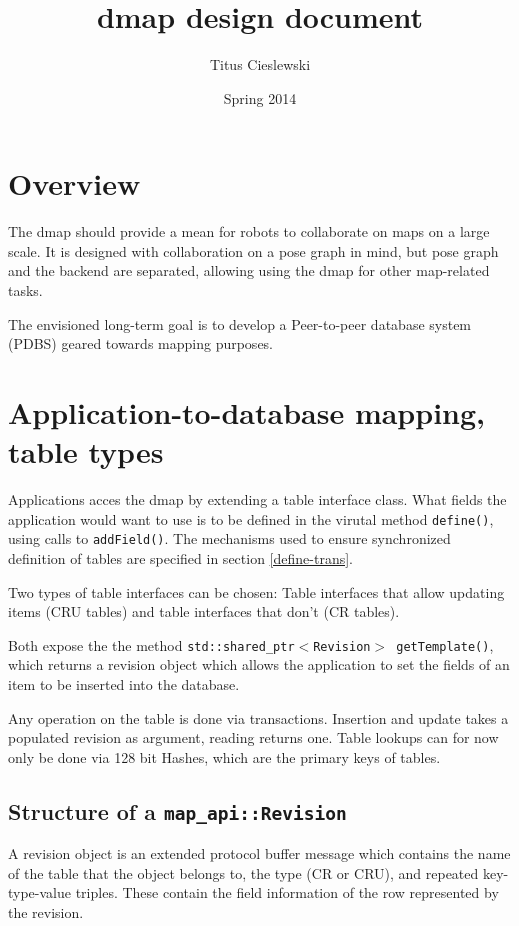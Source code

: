 \documentclass{article}
\title{dmap design document}
\author{Titus Cieslewski}
\date{Spring 2014}
\begin{document}
\maketitle

\section{Overview}

The dmap should provide a mean for robots to collaborate on maps on a large
scale. It is designed with collaboration on a pose graph in mind, but pose
graph and the backend are separated, allowing using the dmap for other
map-related tasks.

The envisioned long-term goal is to develop a Peer-to-peer database system
(PDBS) geared towards mapping purposes.

\section{Application-to-database mapping, table types}

Applications acces the dmap by extending a table interface class. What
fields the application would want to use is to be defined in the virutal
method {\tt define()}, using calls to {\tt addField()}. The mechanisms used to
ensure synchronized definition of tables are specified in section 
\ref{define-trans}.

Two types of table interfaces can be chosen: Table interfaces that allow
updating items (CRU tables) and table interfaces that don't (CR tables). 

Both expose the the method {\tt std::shared\_ptr$<$Revision$>$ getTemplate()},
which returns a revision object which allows the application to set the fields
of an item to be inserted into the database.

Any operation on the table is done via transactions. Insertion and update takes
a populated revision as argument, reading returns one. Table lookups can for
now only be done via 128 bit Hashes, which are the primary keys of tables.

\subsection{Structure of a {\tt map\_api::Revision}}

A revision object is an extended protocol buffer message which contains the
name of the table that the object belongs to, the type (CR or CRU),
and repeated key-type-value
triples. These contain the field information of the row represented by the
revision.
\end{document}
